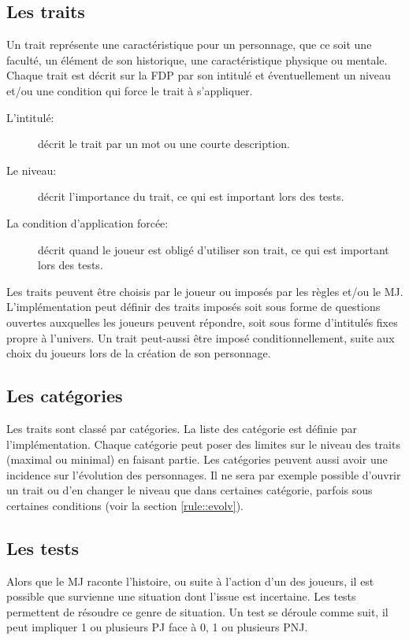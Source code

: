 \documentclass[a4paper,10pt,twoside,twocolumn]{article}
\begin{document}
 \subsection{Les traits}
 \label{rule::traits}
 
 Un trait représente une caractéristique pour un personnage, que ce soit une faculté, un élément de son historique, une caractéristique physique ou mentale. Chaque trait est décrit sur la FDP par son intitulé et éventuellement un niveau et/ou une condition qui force le trait à s'appliquer.
 
 \begin{description}
  \item[L'intitulé:] décrit le trait par un mot ou une courte description.
  \item[Le niveau:] décrit l'importance du trait, ce qui est important lors des tests.
  \item[La condition d'application forcée:] décrit quand le joueur est obligé d'utiliser son trait, ce qui est important lors des tests.
 \end{description}
 
 Les traits peuvent être choisis par le joueur ou imposés par les règles et/ou le MJ. L'implémentation peut définir des traits imposés soit sous forme de questions ouvertes auxquelles les joueurs peuvent répondre, soit sous forme d'intitulés fixes propre à l'univers. Un trait peut-aussi être imposé conditionnellement, suite aux choix du joueurs lors de la création de son personnage.
 
 \subsection{Les catégories}
 \label{rule::cat}
 
 Les traits sont classé par catégories. La liste des catégorie est définie par l'implémentation. Chaque catégorie peut poser des limites sur le niveau des traits (maximal ou minimal) en faisant partie. Les catégories peuvent aussi avoir une incidence sur l'évolution des personnages. Il ne sera par exemple possible d'ouvrir un trait ou d'en changer le niveau que dans certaines catégorie, parfois sous certaines conditions (voir la section \ref{rule::evolv}).
 
 \subsection{Les tests}
 \label{rule::test}
 
 Alors que le MJ raconte l'histoire, ou suite à l'action d'un des joueurs, il est possible que survienne une situation dont l'issue est incertaine. Les tests permettent de résoudre ce genre de situation. Un test se déroule comme suit, il peut impliquer 1 ou plusieurs PJ face à 0, 1 ou plusieurs PNJ.
 
\end{document}
